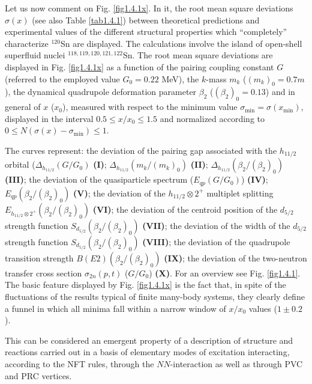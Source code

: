  Let us now  comment on Fig. \ref{fig1.4.1x}. In it, the root mean square deviations $\sigma(x)$ (see also Table \ref{tab1.4.1}) between theoretical predictions  and experimental values of the different structural properties which ``completely'' characterize  $^{120}$Sn are displayed. The calculations involve the island of open-shell superfluid nuclei $^{118,119,120,121,122}$Sn. The root mean square deviations are displayed in Fig. \ref{fig1.4.1x} as a function of the pairing coupling constant $G$ (referred to the employed value $G_0 = 0.22$ MeV), the $k$-mass $m_k$ ($(m_k)_0 = 0.7 m$),  the dynamical quadrupole deformation parameter $\beta_2$ ($(\beta_{2})_0 = 0.13$)  and in general of $x$ ($x_0$), measured with respect to the minimum value $\sigma_{\textrm{min}} = \sigma (x_{\textrm{min}})$, displayed in the interval $0.5 \leq x/x_0 \leq 1.5$ and normalized according to $0 \leq N(\sigma(x) - \sigma_{\textrm{min}}) \leq 1$.
 
 
 The  curves represent: the deviation of the  pairing gap associated with the $h_{11/2}$ orbital 
 ($\Delta_{h_{11/2}} (G/G_0)$ \textbf{(I)};  
 $\Delta_{h_{11/2}} (m_k/(m_k)_0)$ \textbf{(II)};  $\Delta_{h_{11/2}} (\beta_{2}/(\beta_{2})_0)$ \textbf{(III)};
 the deviation of the quasiparticle spectrum ($E_{qp}(G/G_0)$) \textbf{(IV)};  $E_{qp}(\beta_{2}/(\beta_{2})_0)$ \textbf{(V)};
 the deviation of the $h_{11/2}\otimes 2^+$ multiplet splitting  $E_{h_{11/2}\otimes 2^+}(\beta_{2}/(\beta_{2})_0)$ \textbf{(VI)}; 
 the deviation of the  centroid position of the $d_{5/2}$ strength function $S_{d_{5/2}}(\beta_{2}/(\beta_{2})_0)$ \textbf{(VII)}; 
 the deviation of the width of the $d_{5/2}$ strength function  $S_{d_{5/2}} (\beta_{2}/(\beta_{2})_0)$ \textbf{(VIII)};
 the deviation  of the  quadrupole transition strength  $B(E2) (\beta_{2}/(\beta_{2})_0)$ \textbf{(IX)}; the deviation of the two-neutron transfer cross section $\sigma_{2n} (p,t)$ ($G/G_0$) \textbf{(X)}. For an overview see Fig. \ref{fig1.4.1}.
 The basic feature displayed by  Fig. \ref{fig1.4.1x} is the fact that, in spite of the fluctuations of the results typical of finite  many-body systems, they clearly define a funnel in which all minima fall within a narrow window of $x/x_0$ values ($1 \pm 0.2$). 
 
 This can be considered  an emergent property of a description of structure and reactions carried out in a basis of elementary modes of excitation interacting, according to the NFT rules, through the $NN$-interaction as well as through PVC and PRC vertices. 
 
